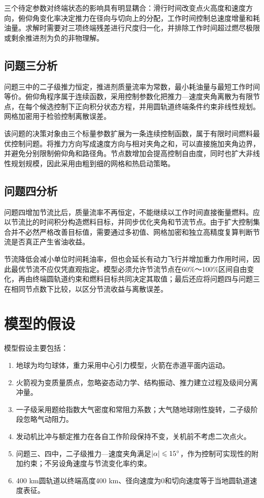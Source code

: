 \documentclass{JXUSTmodeling}
\begin{document}
三个待定参数对终端状态的影响具有明显耦合：滑行时间改变点火高度和速度方向，俯仰角变化率决定推力在径向与切向上的分配，工作时间控制总速度增量和耗油量。求解时需要对三项终端残差进行尺度归一化，并排除工作时间超过燃尽极限或剩余推进剂为负的非物理解。
\subsection{问题三分析}
\label{sub:2.4}
问题三中的二子级推力恒定，推进剂质量流率为常数，最小耗油量与最短工作时间等价。俯仰角程序属于连续函数，采用控制参数化把推力—速度夹角离散为有限节点，在每个候选控制下正向积分状态方程，并用圆轨道终端条件约束非线性规划。网格加密用于检验控制离散误差。

该问题的决策对象由三个标量参数扩展为一条连续控制函数，属于有限时间燃料最优控制问题。将推力方向写成速度方向与相对夹角之和，可以直接施加夹角边界，并避免分别限制俯仰角和路径角。节点数增加会提高控制自由度，同时也扩大非线性规划规模，因此采用由粗到细的网格和热启动策略。
\subsection{问题四分析}
\label{sub:2.5}
问题四增加节流比后，质量流率不再恒定，不能继续以工作时间直接衡量燃料。应以节流比的时间积分构造燃料目标，并同步优化夹角和节流节点。由于扩大控制集合并不必然严格改善目标值，需要通过多初值、网格加密和独立高精度复算判断节流是否真正产生省油收益。

节流降低会减小单位时间耗油率，但也会延长有动力飞行并增加重力作用时间，因此最优节流不应仅凭直观指定。模型必须允许节流节点在60\%～100\%区间自由变化，再由终端圆轨道约束和燃料目标共同决定其取值；最后还应将问题四与问题三在相同节点数下比较，以区分节流收益与离散误差。
\section{模型的假设}\label{sec:3}
模型假设主要包括：
\begin{enumerate}
	\item 地球为均匀球体，重力采用中心引力模型，火箭在赤道平面内运动。
	\item 火箭视为变质量质点，忽略姿态动力学、结构振动、推力建立过程及级间分离冲量。
	\item 一子级采用题给指数大气密度和常阻力系数；大气随地球刚性旋转，二子级阶段忽略气动阻力。
	\item 发动机比冲与额定推力在各自工作阶段保持不变，关机前不考虑二次点火。
	\item 问题三、四中，二子级推力—速度夹角满足$\abs{\alpha} \leqslant 15^\circ$，作为控制可实现性的附加约束；不另设角速度与节流变化率约束。
	\item 400 km圆轨道以终端高度400 km、径向速度为0和切向速度等于当地圆轨道速度表征。
\end{enumerate}
\end{document}

